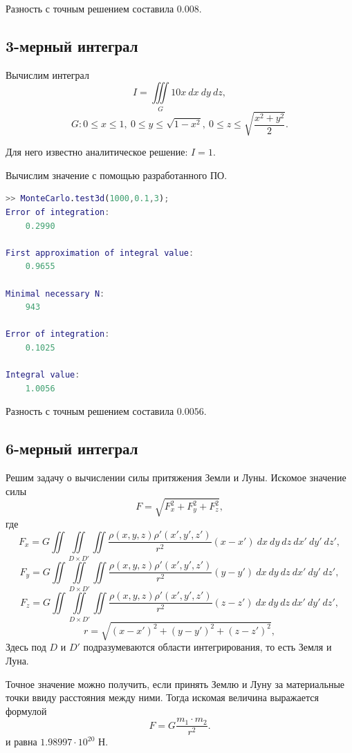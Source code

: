 \documentclass[a4paper,12pt]{article}
\begin{document}
Разность с точным решением составила $0.008$.


\newpage
\subsection{3-мерный интеграл}

Вычислим интеграл
\begin{equation}
	I = \iiint\limits_G 10x\:dx\:dy\:dz,
\end{equation}
\[
	G: 0 \leq x \leq 1,\:
	   0 \leq y \leq \sqrt{1-x^2},\:
	   0 \leq z \leq \sqrt{\frac{x^2 + y^2}{2}}.
\]

Для него известно аналитическое решение: $I = 1$.

Вычислим значение с помощью разработанного ПО.

\begin{lstlisting}[language=MATLAB]
>> MonteCarlo.test3d(1000,0.1,3);
Error of integration:
    0.2990

First approximation of integral value:
    0.9655

Minimal necessary N:
    943

Error of integration:
    0.1025

Integral value:
    1.0056
\end{lstlisting}

Разность с точным решением составила $0.0056$.


\newpage
\subsection{6-мерный интеграл}

Решим задачу о вычислении силы притяжения Земли и Луны. Искомое значение силы
\begin{equation}
	F = \sqrt{F_x^2 + F_y^2 + F_z^2},
\end{equation}
где
\[
	F_x = G \iint \iint\limits_{D \times D'} \iint \frac{\rho(x,y,z)\rho'(x',y',z')}{r^2}(x-x')\:dx\:dy\:dz\:dx'\:dy'\:dz',
\]
\[
	F_y = G \iint \iint\limits_{D \times D'} \iint \frac{\rho(x,y,z)\rho'(x',y',z')}{r^2}(y-y')\:dx\:dy\:dz\:dx'\:dy'\:dz',
\]
\[
	F_z = G \iint \iint\limits_{D \times D'} \iint \frac{\rho(x,y,z)\rho'(x',y',z')}{r^2}(z-z')\:dx\:dy\:dz\:dx'\:dy'\:dz',
\]
\[	
	r = \sqrt{(x-x')^2 + (y-y')^2 + (z-z')^2},
\]
Здесь под $D$ и $D'$ подразумеваются области интегрирования, то есть Земля и Луна.

Точное значение можно получить, если принять Землю и Луну за материальные точки ввиду расстояния между ними. Тогда искомая величина выражается формулой
\begin{equation}
	F = G \frac{m_1 \cdot m_2}{r^2}.
\end{equation}
и равна $1.98997 \cdot 10^{20}$ Н.
\end{document}
